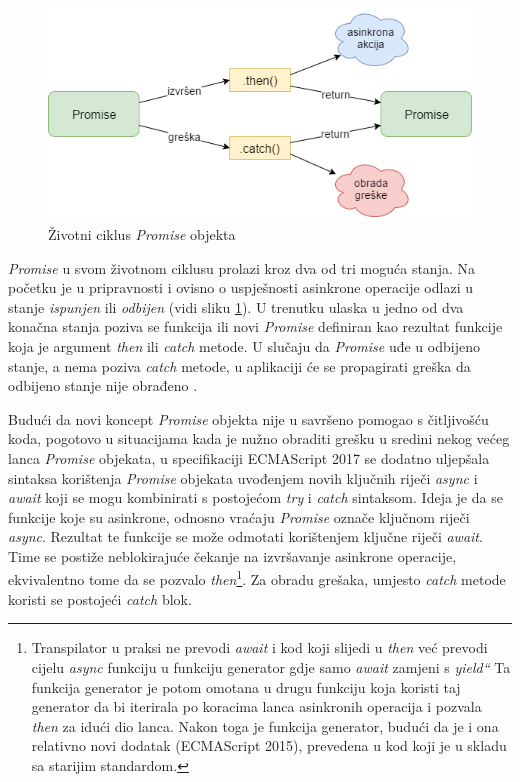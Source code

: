 \documentclass[times, utf8, diplomski, numeric]{fer}
\newcommand{\razmakp}{\vspace{18pt}}
\begin{document}
\begin{figure}[!htb] %
    \centering
    \includegraphics[width=14cm]{images/promise.png}
    \caption{Životni ciklus \emph{Promise} objekta}
    \label{fig:promise_lifecycle}
\end{figure}

\emph{Promise} u svom životnom ciklusu prolazi kroz dva od tri moguća stanja.
Na početku je u pripravnosti  i ovisno o uspješnosti asinkrone operacije odlazi u stanje \emph{ispunjen}  ili \emph{odbijen}  (vidi sliku \ref{fig:promise_lifecycle}).
U trenutku ulaska u jedno od dva konačna stanja poziva se funkcija ili novi \emph{Promise} definiran kao rezultat funkcije koja je argument \emph{then} ili \emph{catch} metode.
U slučaju da \emph{Promise} uđe u odbijeno stanje, a nema poziva \emph{catch} metode, u aplikaciji će se propagirati greška da odbijeno stanje nije obrađeno .\citep{mdn_promise}

\razmakp

Budući da novi koncept \emph{Promise} objekta nije u savršeno pomogao s čitljivošću koda, pogotovo u situacijama kada je nužno obraditi grešku u sredini nekog većeg lanca \emph{Promise} objekata, u specifikaciji ECMAScript 2017 se dodatno uljepšala sintaksa korištenja \emph{Promise} objekata uvođenjem novih ključnih riječi \emph{async} i \emph{await} koji se mogu kombinirati s postojećom \emph{try} i \emph{catch} sintaksom.
Ideja je da se funkcije koje su asinkrone, odnosno vraćaju \emph{Promise} označe ključnom riječi \emph{async}.
Rezultat te funkcije se može odmotati korištenjem ključne riječi \emph{await}.
Time se postiže neblokirajuće čekanje na izvršavanje asinkrone operacije, ekvivalentno tome da se pozvalo \emph{then}\footnote{
    Transpilator u praksi ne prevodi \emph{await} i kod koji slijedi u \emph{then} već prevodi cijelu \emph{async} funkciju u funkciju generator  gdje samo \emph{await} zamjeni s \emph{yield“} Ta funkcija generator je potom omotana u drugu funkciju koja koristi taj generator da bi iterirala po koracima lanca asinkronih operacija i pozvala \emph{then} za idući dio lanca. Nakon toga je funkcija generator, budući da je i ona relativno novi dodatak (ECMAScript 2015), prevedena u kod koji je u skladu sa starijim standardom.
}.
Za obradu grešaka, umjesto \emph{catch} metode koristi se postojeći \emph{catch} blok.
\end{document}
